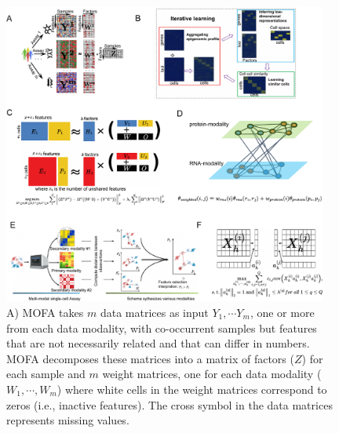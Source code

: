\begin{figure}[!hb]
	\centering
	\includegraphics[width=0.95\textwidth]{multimodal_integration_methods_schematic/fig}
	\vspace{0.1cm}
	\caption[Illustration of mulitmodal integration competing methods schematic.]{
	A) MOFA takes $m$ data matrices as input $Y_1, \cdots Y_m$, one or more from each data modality, with co-occurrent samples but features that are not necessarily related and that can differ in numbers. MOFA decomposes these matrices into a matrix of factors ($Z$) for each sample and $m$ weight matrices, one for each data modality ($W_1,\cdots, W_m$) where white cells in the weight matrices correspond to zeros (i.e., inactive features). The cross symbol in the data matrices represents missing values. 
}
	\label{fig:multimodal_integration_methods_schematic}
\end{figure}

